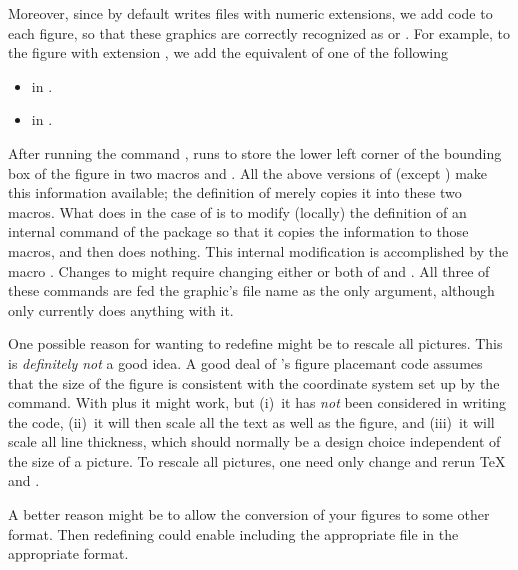 \documentclass[letterpaper]{article}
\begin{document}
\medskip
Moreover, since \MP{} by default writes files with numeric extensions,
we add code to each figure, so that these graphics are correctly
recognized as \EPS{} or . For example, to the figure with
extension , we add the equivalent of one of the following
\begin{itemize}
  \item[] \marg{} in
    \LaTeXe{}.
  \item[] \marg{} in
    \pdfLaTeX{}.
\end{itemize}

After running the command , \mfp{} runs
 to store the lower left corner of the bounding box
of the figure in two macros  and . All the
above versions of  (except )
make this information available; the definition of 
merely copies it into these two macros. What \mfp{} does in the
case of  is to modify (locally) the definition of an
internal command of the  package so that it copies the
information to those macros, and then  does nothing.
This internal modification is accomplished by the macro
. Changes to  might require
changing either or both of  and
. All three of these commands are fed the graphic's
file name as the only argument, although only 
currently does anything with it.

One possible reason for wanting to redefine  might
be to rescale all pictures. This is \emph{definitely not} a good idea. A
good deal of \mfp{}'s figure placemant code assumes that the size of the
figure is consistent with the coordinate system set up by the 
command. With  plus  it might work, but
(i)~it has \emph{not} been considered in writing the \mfp{} code,
(ii)~it will then scale all the text as well as the figure, and (iii)~it
will scale all line thickness, which should normally be a design choice
independent of the size of a picture. To rescale all pictures, one need
only change  and rerun \TeX{} and \MP{}.

A better reason might be to allow the conversion of your \MP{} figures
to some other format. Then redefining  could enable
including the appropriate file in the appropriate format.
\end{document}
